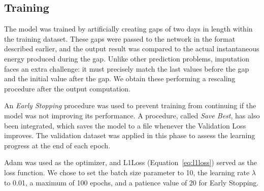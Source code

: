 \subsection{Training}
The model was trained by artificially creating gaps of two days in length within the
training dataset.
These gaps were passed to the network in the format described earlier,
and the output result was compared to the actual instantaneous energy produced during the gap.
Unlike other prediction problems, imputation faces an extra challenge: it must precisely match the last values before the gap and the initial value after the gap. We obtain these performing a rescaling procedure after the output computation.

An \textit{Early Stopping} \cite{es} procedure was used
to prevent training from continuing if
the model was not improving its performance.
A procedure, called \textit{Save Best}, has also been integrated,
which saves the model to a file whenever the Validation Loss improves.
The validation dataset was applied in this phase to assess the learning progress at the end
of each epoch.


Adam \cite{adam} was used as the optimizer,
and L1Loss \cite{loss} (Equation~\ref{eq:l1loss}) served as the loss function.
We chose to set the batch size parameter to 10, the learning rate $\lambda$ to 0.01,
a maximum of 100 epochs, and a patience value of 20 for Early Stopping.


